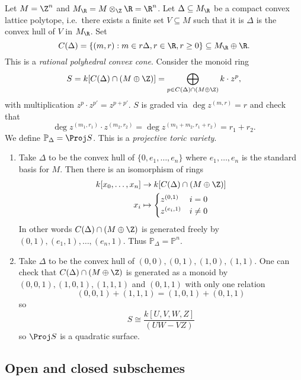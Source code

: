 \documentclass[a4paper]{article}
\renewcommand*{\P}{\mathbb{P}}
\begin{document}
\begin{eg}
  Let \(M = \Z^n\) and \(M_\R = M \otimes_\Z \R = \R^n\). Let \(\Delta \subseteq M_\R\) be a compact convex lattice polytope, i.e.\ there exists a finite set \(V \subseteq M\) such that it is \(\Delta\) is the convex hull of \(V\) in \(M_\R\). Set
  \[
    C(\Delta) = \{(m, r): m \in r \Delta, r \in \R, r \geq 0\} \subseteq M_\R \oplus \R.
  \]
  This is a \emph{rational polyhedral convex cone}. Consider the monoid ring
  \[
    S = k[C(\Delta) \cap (M \oplus \Z)] = \bigoplus_{p \in C(\Delta) \cap (M \oplus \Z)} k \cdot z^p,
  \]
  with multiplication \(z^p \cdot z^{p'} = z^{p + p'}\). \(S\) is graded via \(\deg z^{(m, r)} = r\) and check that
  \[
    \deg z^{(m_1, r_1)} \cdot z^{(m_2, r_2)} = \deg z^{(m_1 + m_2, r_1 + r_2)} = r_1 + r_2.
  \]
  We define \(\P_\Delta = \Proj S\). This is a \emph{projective toric variety}.
\end{eg}

\begin{eg}\leavevmode
  \begin{enumerate}
  \item Take \(\Delta\) to be the convex hull of \(\{0, e_1, \dots, e_n\}\) where \(e_1, \dots, e_n\) is the standard basis for \(M\). Then there is an isomorphism of rings
    \begin{align*}
      k[x_0, \dots, x_n] &\to k[C(\Delta) \cap (M \oplus \Z)] \\
      x_i &\mapsto
            \begin{cases}
              z^{(0, 1)} & i = 0 \\
              z^{(e_i, 1)} & i \ne 0
            \end{cases}
    \end{align*}
    In other words \(C(\Delta) \cap (M \oplus \Z)\) is generated freely by \((0, 1), (e_1, 1), \dots, (e_n, 1)\). Thus \(\P_\Delta = \P^n\).
  \item Take \(\Delta\) to be the convex hull of \((0, 0), (0, 1), (1, 0), (1, 1)\). One can check that \(C(\Delta) \cap (M \oplus \Z)\) is generated as a monoid by \((0, 0, 1), (1, 0, 1), (1, 1, 1)\) and \((0, 1, 1)\) with only one relation
    \[
      (0, 0, 1) + (1, 1, 1) = (1, 0, 1) + (0, 1, 1)
    \]
    so
    \[
      S \cong \frac{k[U, V, W, Z]}{(UW - VZ)}
    \]
    so \(\Proj S\) is a quadratic surface.
  \end{enumerate}
\end{eg}

\subsection{Open and closed subschemes}
\end{document}
